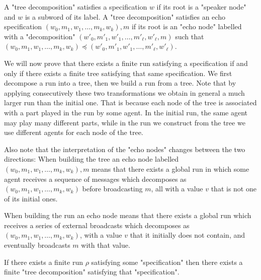 \begin{definition}
	A "tree decomposition" satisfies a specification $w$ if its root is a "speaker node" and $w$ is a subword of its label.
	A "tree decomposition" satisfies an echo specification $(w_0, m_1, w_1, \ldots, m_k, w_k) ,m$ if its root is an "echo node" labelled with a "decomposition" $(w'_0, m'_1, w'_1, \ldots, m'_\ell, w'_\ell,m)$ such that  $(w_0, m_1, w_1, \ldots, m_k, w_k) \preceq (w'_0, m'_1, w'_1, \ldots, m'_\ell, w'_\ell)$.
\end{definition}

We will now prove that there exists a finite run satisfying a specification if and only if there exists a finite tree satisfying that same specification.
We first decompose a run into a tree, then we build a run from a tree. Note that by applying consecutively these two transformations we obtain in general a much larger run than the initial one. That is because each node of the tree is associated with a part played in the run by some agent. In the initial run, the same agent may play many different parts, while in the run we construct from the tree we use different agents for each node of the tree.

Also note that the interpretation of the "echo nodes" changes between the two directions: When building the tree an echo node labelled $(w_0, m_1, w_1, \ldots, m_k, w_k) ,m$ means that there exists a global run in which some agent receives a sequence of messages which decomposes as  $(w_0, m_1, w_1, \ldots, m_k, w_k)$ before broadcasting $m$, all with a value $v$ that is not one of its initial ones.

When building the run an echo node means that there exists a global run which receives a series of external broadcasts which decomposes as $(w_0, m_1, w_1, \ldots, m_k, w_k)$, with a value $v$ that it initially does not contain, and eventually broadcasts $m$ with that value.

\begin{lemma}
	If there exists a finite run $\rho$ satisfying some "specification" then there exists a finite "tree decomposition" satisfying that "specification".
\end{lemma}

